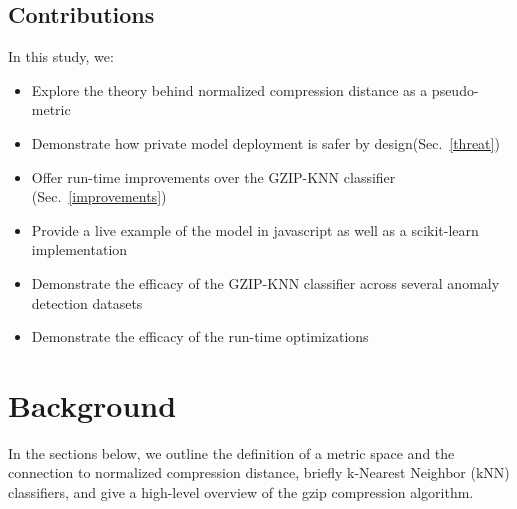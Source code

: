 \documentclass[conference]{IEEEtran}
\begin{document}
\subsection{Contributions}

In this study, we:

\begin{itemize}
    \item Explore the theory behind normalized compression distance as a pseudo-metric
    \item Demonstrate how private model deployment is safer by design(Sec.~\ref{threat})
    \item Offer run-time improvements over the GZIP-KNN classifier (Sec.~\ref{improvements})
    \item Provide a live example of the model in javascript as well as a scikit-learn implementation
    \item Demonstrate the efficacy of the GZIP-KNN classifier across several anomaly detection datasets
    \item Demonstrate the efficacy of the run-time optimizations
\end{itemize}


\section{Background}

In the sections below, we outline the definition of a metric space and the connection to normalized compression distance, briefly k-Nearest Neighbor (kNN) classifiers, and give a high-level overview of the gzip compression algorithm.
\end{document}
